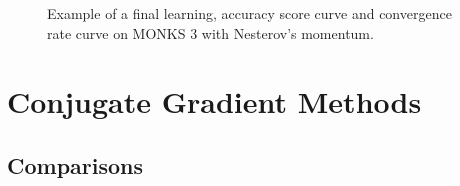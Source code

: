 \begin{appendices}
\begin{figure}[H]
\begin{subfigure}{0.40\textwidth}
                    \label{fig:monks_3_ACC_SGD}
                \end{subfigure}
                \begin{subfigure}{0.40\textwidth}
                    \caption{}
                    \label{fig:monks_3_NORM_SGD}
                \end{subfigure}
                \caption{Example of a final learning, accuracy score curve and
                convergence rate curve on MONKS 3 with Nesterov's momentum.}
                \label{fig:monks_1_SGD}
            \end{figure}


         \section{Conjugate Gradient Methods} %
         \label{sec:conjugate_gradient_methods}
            \subsection{Comparisons} %
            \label{sub:comparisons}


\end{appendices}
